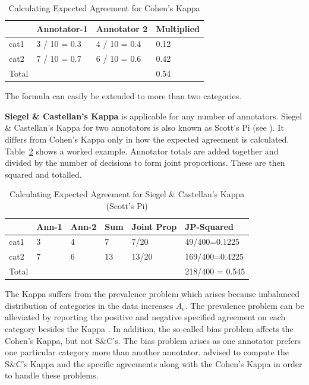 \begin{table}[hbt]
{\centering
\begin{tabular}{|l|l|l|l|} 
\hline
   & Annotator-1 & Annotator 2 & Multiplied \\
\hline
cat1 & 3 / 10 = 0.3 & 4 / 10 = 0.4 & 0.12 \\ 
cat2 & 7 / 10 = 0.7 & 6 / 10 = 0.6 & 0.42 \\
\hline
Total & & & 0.54 \\
\hline
\end{tabular}\par}
\caption{Calculating Expected Agreement for Cohen's Kappa}
\label{table:iaa-kappa:cohens}
\end{table}

The formula can easily be extended to more than two categories.

{\bf Siegel \& Castellan's Kappa} is applicable for any number of annotators.
Siegel \& Castellan's Kappa for two annotators is also known as Scott's Pi (see
\cite{Lombard02}). It differs from Cohen's Kappa only in how the expected
agreement is calculated. Table~\ref{table:iaa-kappa:scotts} shows a worked
example. Annotator totals are added together and divided by the number of
decisions to form joint proportions. These are then squared and totalled.

\begin{table}[hbt]
{\centering
\begin{tabular}{|l|l|l|l|l|l|} 
\hline
   & Ann-1 & Ann-2 & Sum & Joint Prop &
   JP-Squared \\
\hline
cat1 & 3 & 4 & 7 & 7/20 & 49/400=0.1225 \\ 
cat2 & 7 & 6 & 13 & 13/20 & 169/400=0.4225 \\ 
\hline
Total & & & & & 218/400 = 0.545 \\
\hline
\end{tabular}\par}
\caption{Calculating Expected Agreement for Siegel \& Castellan's Kappa
(Scott's Pi)}
\label{table:iaa-kappa:scotts}
\end{table}

The Kappa suffers from the prevalence problem which arises because imbalanced
distribution of categories in the data increases $A_{e}$. The prevalence problem
can be alleviated by reporting the positive and negative specified  agreement on
each category besides the Kappa \cite{ Hripcsak02, Eugenio04}. In addition, the
so-called bias problem affects the Cohen's Kappa, but not S\&C's. The bias
problem arises as one annotator prefers one particular category more than another
annotator. \cite{Eugenio04} advised to compute the S\&C's Kappa and the specific
agreements along with the Cohen's Kappa in order to handle these problems.

